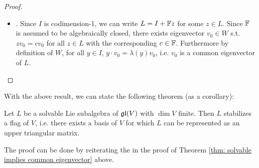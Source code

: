 \documentclass{article}
\begin{document}
\begin{proof}
\begin{itemize}
        \item {}. Since $I$ is codimension-1, we can write $L = I + \mathbb{F} z$ for some $z \in L$. Since $\mathbb{F}$ is assumed to be algebraically closed, there exists eigenvector $v_0 \in W$ s.t. $z v_0 = c v_0$ for all $z \in L$ with the corresponding $c \in \mathbb{F}$. Furthermore by definition of $W$, for all $y \in I$, $y \cdot v_0 = \lambda(y) v_0$, i.e. $v_0$ is a common eigenvector of $L$. 
    \end{itemize}
\end{proof}

\textstart
With the above result, we can state the following theorem (as a corollary):

\begin{theorem}[Lie]
    Let $L$ be a solvable Lie subalgebra of $\mathfrak{gl}(V)$ with $\dim V$ finite. Then $L$ stabilizes a flag of $V$, i.e. there exists a basis of $V$ for which $L$ can be represented as an upper triangular matrix.
\end{theorem}

\textstart
The proof can be done by reiterating the  in the proof of Theorem \ref{thm: solvable implies common eigenvector} above.
\end{document}
